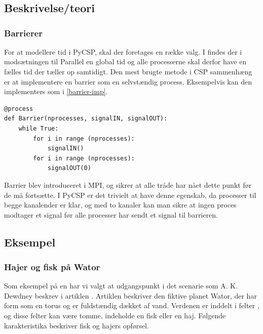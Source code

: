 \chapter{\des}
   \section{Beskrivelse/teori}
    
\subsection*{Barrierer}\label{barrier}
For at modellere tid i PyCSP, skal der foretages en 
række valg. I \des findes der i modsætningen til 
Parallel \des {} en global tid og alle processerne skal derfor have  en 
fælles tid der tæller op samtidigt. Den mest brugte metode i CSP sammenhæng er 
at implementere en barrier som en selvstændig process. Eksempelvis kan den implementers som i \autoref{barrier-imp}.

\begin{lstlisting}[float, label=barrier-imp,caption=En barrier i PyCSP]
@process
def Barrier(nprocesses, signalIN, signalOUT):
	while True:
		for i in range (nprocesses):
			signalIN()
		for i in range (nprocesses):
			signalOUT(0)
\end{lstlisting}

Barrier blev introduceret i MPI, og sikrer at alle tråde har nået dette punkt 
før de må fortsætte. I PyCSP er det trivielt at have  denne egenskab, da 
processer til begge kanalender er klar, og med to kanaler kan man sikre at 
ingen proces modtager et signal før alle processer har sendt et signal til 
barrieren.

\section{Eksempel}


\subsection{Hajer og fisk på Wator} Som eksempel på en \des har vi valgt at 
udgangspunkt i det scenarie som A. K. Dewdney
beskrev i artiklen \cite{wator}. Artiklen beskriver den
fiktive planet Wator, der har form som en torus og er fuldstændig
dækket af vand. Verdenen er inddelt i felter \cite[s. 20]{wator}, og disse felter kan være tomme, indeholde en
fisk eller en haj. Følgende karakteristika beskriver fisk og hajers
opførsel.

